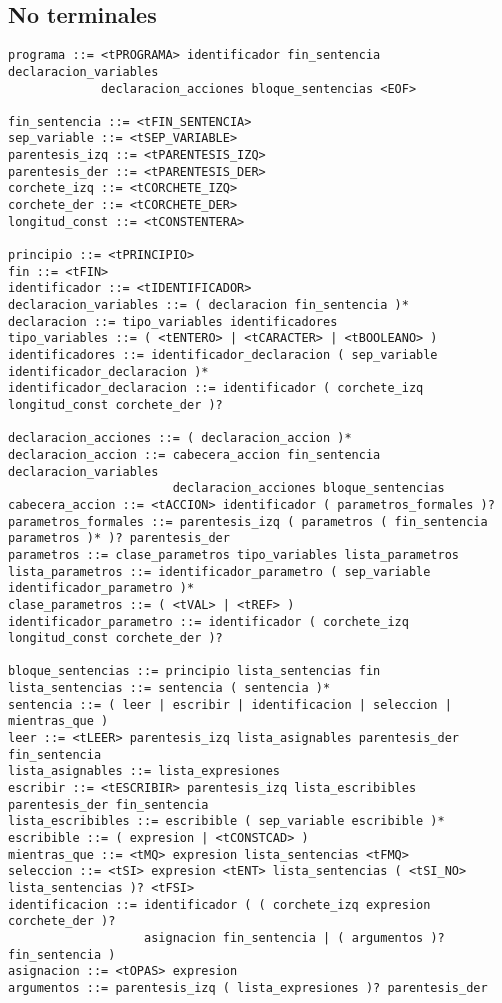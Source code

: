 \subsection{No terminales}

\begin{Verbatim}[fontsize=\small]
programa ::= <tPROGRAMA> identificador fin_sentencia declaracion_variables
             declaracion_acciones bloque_sentencias <EOF>

fin_sentencia ::= <tFIN_SENTENCIA>
sep_variable ::= <tSEP_VARIABLE>
parentesis_izq ::= <tPARENTESIS_IZQ>
parentesis_der ::= <tPARENTESIS_DER>
corchete_izq ::= <tCORCHETE_IZQ>
corchete_der ::= <tCORCHETE_DER>
longitud_const ::= <tCONSTENTERA>

principio ::= <tPRINCIPIO>
fin ::= <tFIN>
identificador ::= <tIDENTIFICADOR>
declaracion_variables ::= ( declaracion fin_sentencia )*
declaracion ::= tipo_variables identificadores
tipo_variables ::= ( <tENTERO> | <tCARACTER> | <tBOOLEANO> )
identificadores ::= identificador_declaracion ( sep_variable identificador_declaracion )*
identificador_declaracion ::= identificador ( corchete_izq longitud_const corchete_der )?

declaracion_acciones ::= ( declaracion_accion )*
declaracion_accion ::= cabecera_accion fin_sentencia declaracion_variables
                       declaracion_acciones bloque_sentencias
cabecera_accion ::= <tACCION> identificador ( parametros_formales )?
parametros_formales ::= parentesis_izq ( parametros ( fin_sentencia parametros )* )? parentesis_der
parametros ::= clase_parametros tipo_variables lista_parametros
lista_parametros ::= identificador_parametro ( sep_variable identificador_parametro )*
clase_parametros ::= ( <tVAL> | <tREF> )
identificador_parametro ::= identificador ( corchete_izq longitud_const corchete_der )?

bloque_sentencias ::= principio lista_sentencias fin
lista_sentencias ::= sentencia ( sentencia )*
sentencia ::= ( leer | escribir | identificacion | seleccion | mientras_que )
leer ::= <tLEER> parentesis_izq lista_asignables parentesis_der fin_sentencia
lista_asignables ::= lista_expresiones
escribir ::= <tESCRIBIR> parentesis_izq lista_escribibles parentesis_der fin_sentencia
lista_escribibles ::= escribible ( sep_variable escribible )*
escribible ::= ( expresion | <tCONSTCAD> )
mientras_que ::= <tMQ> expresion lista_sentencias <tFMQ>
seleccion ::= <tSI> expresion <tENT> lista_sentencias ( <tSI_NO> lista_sentencias )? <tFSI>
identificacion ::= identificador ( ( corchete_izq expresion corchete_der )?
                   asignacion fin_sentencia | ( argumentos )? fin_sentencia )
asignacion ::= <tOPAS> expresion
argumentos ::= parentesis_izq ( lista_expresiones )? parentesis_der


\end{Verbatim}
